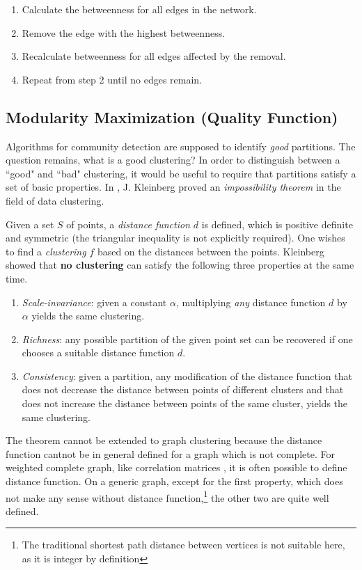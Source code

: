 {\begin{enumerate}
	\item Calculate the betweenness for all edges in the network.
	\item Remove the edge with the highest betweenness.
	\item Recalculate betweenness for all edges affected by the removal.
	\item Repeat from step 2 until no edges remain.
\end{enumerate}

\subsection{Modularity Maximization (Quality Function)}\label{subsec:modularity_maximization}
Algorithms for community detection are supposed to identify \textit{good} partitions. The question remains, what is a good clustering? In order to distinguish between a ``good" and ``bad" clustering, it would be useful to require that partitions satisfy a set of basic properties. In \cite{ref-14}, J. Kleinberg proved an \textit{impossibility theorem} in the field of data clustering.

Given a set $S$ of points, a \textit{distance function} $d$ is defined, which is positive definite and symmetric (the triangular inequality is not explicitly required). One wishes to find a \textit{clustering} $f$ based on the distances between the points. Kleinberg showed that \textbf{no clustering} can satisfy the following three properties at the same time.

\begin{enumerate}
	\item \textit{Scale-invariance}: given a constant $\alpha$, multiplying \textit{any} distance function $d$ by $\alpha$ yields the same clustering.
	\item \textit{Richness}: any possible partition of the given point set can be recovered if one chooses a suitable distance function $d$.
	\item \textit{Consistency}: given a partition, any modification of the distance function that does not decrease the distance between points of different clusters and that does not increase the distance between points of the same cluster, yields the same clustering.
\end{enumerate}

The theorem cannot be extended to graph clustering because the distance function cantnot be in general defined for a graph which is not complete. For weighted complete graph, like  correlation matrices \cite{ref-15}, it is often possible to define distance function. On a generic graph, except for the first property, which does not make any sense without distance function,\footnote{The traditional shortest path distance between vertices is not suitable here, as it is integer by definition} the other two are quite well defined.

}
